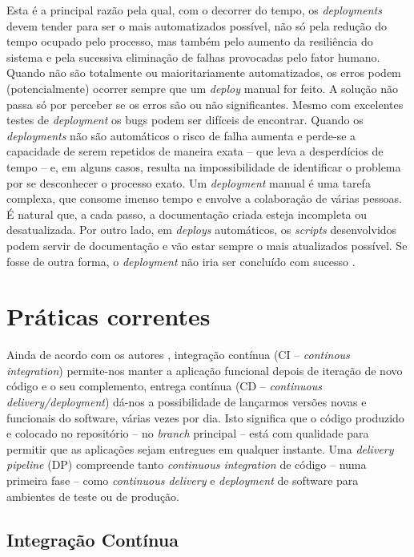\hspace{1cm}Esta é a principal razão pela qual, com o decorrer do tempo, os \textit{deployments} devem tender para ser o mais automatizados possível, não só pela redução do tempo ocupado pelo processo, mas também pelo aumento da resiliência do sistema e pela sucessiva eliminação de falhas provocadas pelo fator humano. Quando não são totalmente ou maioritariamente automatizados, os erros podem (potencialmente) ocorrer sempre que um \textit{deploy} manual for feito. A solução não passa só por perceber se os erros são ou não significantes. Mesmo com excelentes testes de \textit{deployment} os bugs podem ser difíceis de encontrar. Quando os \textit{deployments} não são automáticos o risco de falha aumenta e perde-se a capacidade de serem repetidos de maneira exata -- que leva a desperdícios de tempo -- e, em alguns casos, resulta na impossibilidade de identificar o problema por se desconhecer o processo exato. Um \textit{deployment} manual é uma tarefa complexa, que consome imenso tempo e envolve a colaboração de várias pessoas. É natural que, a cada passo, a documentação criada esteja incompleta ou desatualizada. Por outro lado, em \textit{deploys} automáticos, os \textit{scripts} desenvolvidos podem servir de documentação e vão estar sempre o mais atualizados possível. Se fosse de outra forma, o \textit{deployment} não iria ser concluído com sucesso \cite{farley2010contdel}. 

\section{Práticas correntes}

\hspace{1cm}Ainda de acordo com os autores , integração contínua (CI -- \textit{continous integration}) permite-nos manter a aplicação funcional depois de iteração de novo código e o seu complemento, entrega contínua (CD -- \textit{continuous delivery/deployment}) dá-nos a possibilidade de lançarmos versões novas e funcionais do software, várias vezes por dia. Isto significa que o código produzido e colocado no repositório -- no \textit{branch} principal -- está com qualidade para permitir que as aplicações sejam entregues em qualquer instante. Uma \textit{delivery pipeline} (DP) compreende tanto \textit{continuous integration} de código -- numa primeira fase -- como \textit{continuous delivery} e \textit{deployment} de software para ambientes de teste ou de produção.

\subsection{Integração Contínua}

